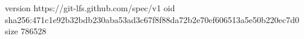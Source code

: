 version https://git-lfs.github.com/spec/v1
oid sha256:471c1e92b32bdb230aba53ad3c67f8f88da72b2e70ef606513a5e50b220ec7d0
size 786528
